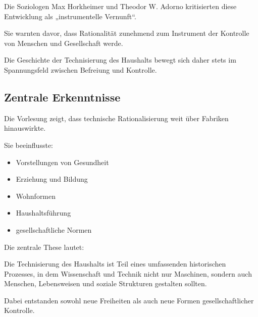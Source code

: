 Die Soziologen Max Horkheimer und Theodor W. Adorno
kritisierten diese Entwicklung als „instrumentelle Vernunft“.

Sie warnten davor,
dass Rationalität zunehmend zum Instrument
der Kontrolle von Menschen und Gesellschaft werde.

Die Geschichte der Technisierung des Haushalts
bewegt sich daher stets im Spannungsfeld
zwischen Befreiung und Kontrolle.

\subsection{Zentrale Erkenntnisse}

Die Vorlesung zeigt,
dass technische Rationalisierung weit über Fabriken hinauswirkte.

Sie beeinflusste:

\begin{itemize}
    \item Vorstellungen von Gesundheit
    \item Erziehung und Bildung
    \item Wohnformen
    \item Haushaltsführung
    \item gesellschaftliche Normen
\end{itemize}

Die zentrale These lautet:

Die Technisierung des Haushalts ist Teil eines umfassenden historischen Prozesses,
in dem Wissenschaft und Technik nicht nur Maschinen,
sondern auch Menschen, Lebensweisen und soziale Strukturen
gestalten sollten.

Dabei entstanden sowohl neue Freiheiten
als auch neue Formen gesellschaftlicher Kontrolle.